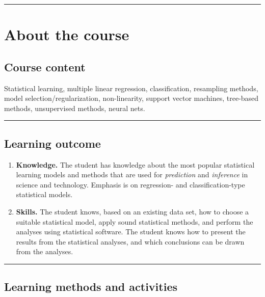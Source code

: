 \documentclass[]{article}
\begin{document}
\begin{center}\rule{0.5\linewidth}{\linethickness}\end{center}

\hypertarget{about-the-course}{%
\section{About the course}\label{about-the-course}}

\hypertarget{course-content}{%
\subsection{Course content}\label{course-content}}

Statistical learning, multiple linear regression, classification,
resampling methods, model selection/regularization, non-linearity,
support vector machines, tree-based methods, unsupervised methods,
neural nets.

\begin{center}\rule{0.5\linewidth}{\linethickness}\end{center}

\hypertarget{learning-outcome}{%
\subsection{Learning outcome}\label{learning-outcome}}

\begin{enumerate}
\def\labelenumi{\arabic{enumi}.}
\item
  \textbf{Knowledge.} The student has knowledge about the most popular
  statistical learning models and methods that are used for
  \emph{prediction} and \emph{inference} in science and technology.
  Emphasis is on regression- and classification-type statistical models.
\item
  \textbf{Skills.} The student knows, based on an existing data set, how
  to choose a suitable statistical model, apply sound statistical
  methods, and perform the analyses using statistical software. The
  student knows how to present the results from the statistical
  analyses, and which conclusions can be drawn from the analyses.
\end{enumerate}

\begin{center}\rule{0.5\linewidth}{\linethickness}\end{center}

\hypertarget{learning-methods-and-activities}{%
\subsection{Learning methods and
activities}\label{learning-methods-and-activities}}
\end{document}
